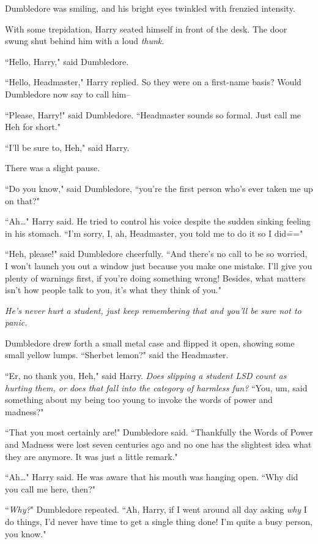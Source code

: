 Dumbledore was smiling, and his bright eyes twinkled with frenzied intensity.

With some trepidation, Harry seated himself in front of the desk. The door swung shut behind him with a loud \emph{thunk}.

``Hello, Harry," said Dumbledore.

``Hello, Headmaster," Harry replied. So they were on a first-name basis? Would Dumbledore now say to call him\---

``Please, Harry!" said Dumbledore. ``Headmaster sounds so formal. Just call me Heh for short."

``I'll be sure to, Heh," said Harry.

There was a slight pause.

``Do you know," said Dumbledore, ``you're the first person who's ever taken me up on that?"

``Ah{\ldots}" Harry said. He tried to control his voice despite the sudden sinking feeling in his stomach. ``I'm sorry, I, ah, Headmaster, you told me to do it so I did\==="

``Heh, please!" said Dumbledore cheerfully. ``And there's no call to be so worried, I won't launch you out a window just because you make one mistake. I'll give you plenty of warnings first, if you're doing something wrong! Besides, what matters isn't how people talk to you, it's what they think of you."

\emph{He's never hurt a student, just keep remembering that and you'll be sure not to panic.}

Dumbledore drew forth a small metal case and flipped it open, showing some small yellow lumps. ``Sherbet lemon?" said the Headmaster.

``Er, no thank you, Heh," said Harry. \emph{Does slipping a student LSD count as hurting them, or does that fall into the category of harmless fun?} ``You, um, said something about my being too young to invoke the words of power and madness?"

``That you most certainly are!" Dumbledore said. ``Thankfully the Words of Power and Madness were lost seven centuries ago and no one has the slightest idea what they are anymore. It was just a little remark."

``Ah{\ldots}" Harry said. He was aware that his mouth was hanging open. ``Why did you call me here, then?"

``\emph{Why?}" Dumbledore repeated. ``Ah, Harry, if I went around all day asking \emph{why} I do things, I'd never have time to get a single thing done! I'm quite a busy person, you know."


